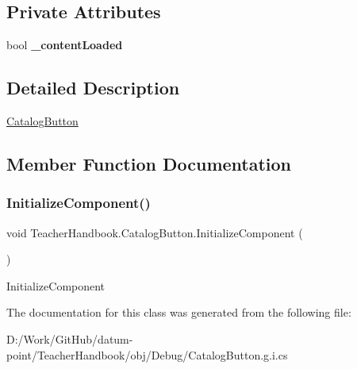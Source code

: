 \subsection*{Private Attributes}
\begin{DoxyCompactItemize}
\item 
\mbox{\label{class_teacher_handbook_1_1_catalog_button_a841881f1c8ba418ddd09ae373f0a51aa}} 
bool {\bfseries \+\_\+content\+Loaded}
\end{DoxyCompactItemize}


\subsection{Detailed Description}
\mbox{\hyperlink{class_teacher_handbook_1_1_catalog_button}{Catalog\+Button}} 



\subsection{Member Function Documentation}
\mbox{\label{class_teacher_handbook_1_1_catalog_button_adb12d2ac86d6ce2674849f4fde4d4517}} 
\subsubsection{\texorpdfstring{Initialize\+Component()}{InitializeComponent()}}
{\footnotesize\ttfamily void Teacher\+Handbook.\+Catalog\+Button.\+Initialize\+Component (\begin{DoxyParamCaption}{ }\end{DoxyParamCaption})}



Initialize\+Component 



The documentation for this class was generated from the following file\+:\begin{DoxyCompactItemize}
\item 
D\+:/\+Work/\+Git\+Hub/datum-\/point/\+Teacher\+Handbook/obj/\+Debug/Catalog\+Button.\+g.\+i.\+cs\end{DoxyCompactItemize}
